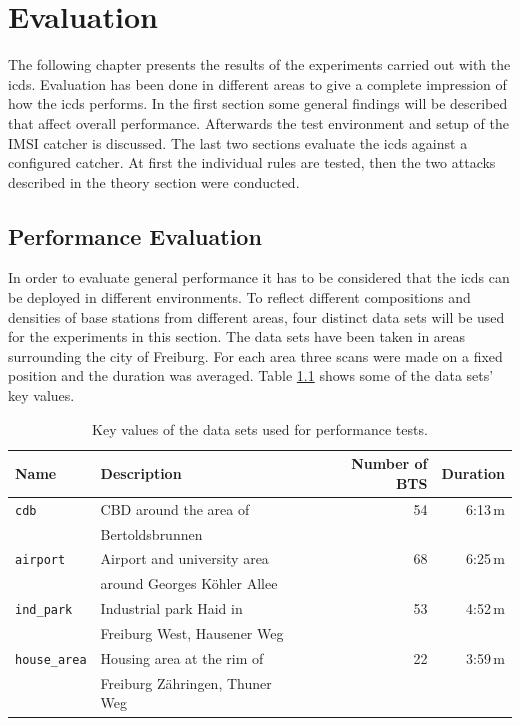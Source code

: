 \chapter{Evaluation}
The following chapter presents the results of the experiments carried out with the \gls{icds}.
Evaluation has been done in different areas to give a complete impression of how the \gls{icds} performs.
In the first section some general findings will be described that affect overall performance.
Afterwards the test environment and setup of the IMSI catcher is discussed.
The last two sections evaluate the \gls{icds} against a configured catcher.
At first the individual rules are tested, then the two attacks described in the theory section were conducted.

\section{Performance Evaluation}
In order to evaluate general performance it has to be considered that the \gls{icds} can be deployed in different environments.
To reflect different compositions and densities of base stations from different areas, four distinct data sets will be used for the experiments in this section.
The data sets have been taken in areas surrounding the city of Freiburg.
For each area three scans were made on a fixed position and the duration was averaged.
Table \ref{tab:key_data} shows some of the data sets' key values.
\begin{table}
\centering
\begin{tabular}{llrr}
\toprule
Name					&Description					&Number of BTS	&Duration\\
\midrule
\texttt{cdb}			&CBD around the area of			&54				&6:13\,m	\\
						&Bertoldsbrunnen				&				&			\\
\texttt{airport}		&Airport and university area	&68				&6:25\,m	\\
						&around Georges K\"ohler Allee	&				&			\\
\texttt{ind\_park}		&Industrial park Haid in 		&53				&4:52\,m	\\
						&Freiburg West,  Hausener Weg	&				&			\\
\texttt{house\_area}	&Housing area at the rim of 	&22				&3:59\,m	\\
						&Freiburg Z\"ahringen, Thuner Weg	&				&			\\
\bottomrule
\end{tabular}
\caption{Key values of the data sets used for performance tests.}
\label{tab:key_data}
\end{table}

